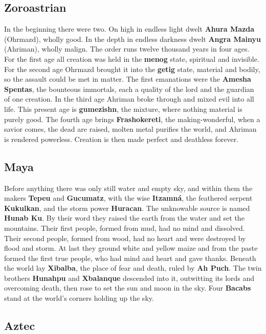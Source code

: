 
\subsection{Zoroastrian}

In the beginning there were two. On high in endless light dwelt \textbf{Ahura Mazda} (Ohrmazd), wholly good. In the depth in endless darkness dwelt \textbf{Angra Mainyu} (Ahriman), wholly malign. The order runs twelve thousand years in four ages. For the first age all creation was held in the \textbf{menog} state, spiritual and invisible. For the second age Ohrmazd brought it into the \textbf{getig} state, material and bodily, so the assault could be met in matter. The first emanations were the \textbf{Amesha Spentas}, the bounteous immortals, each a quality of the lord and the guardian of one creation. In the third age Ahriman broke through and mixed evil into all life. This present age is \textbf{gumezishn}, the mixture, where nothing material is purely good. The fourth age brings \textbf{Frashokereti}, the making-wonderful, when a savior comes, the dead are raised, molten metal purifies the world, and Ahriman is rendered powerless. Creation is then made perfect and deathless forever.

\subsection{Maya}

Before anything there was only still water and empty sky, and within them the makers \textbf{Tepeu} and \textbf{Gucumatz}, with the wise \textbf{Itzamn\'a}, the feathered serpent \textbf{Kukulkan}, and the storm power \textbf{Huracan}. The unknowable source is named \textbf{Hunab Ku}. By their word they raised the earth from the water and set the mountains. Their first people, formed from mud, had no mind and dissolved. Their second people, formed from wood, had no heart and were destroyed by flood and storm. At last they ground white and yellow maize and from the paste formed the first true people, who had mind and heart and gave thanks. Beneath the world lay \textbf{Xibalba}, the place of fear and death, ruled by \textbf{Ah Puch}. The twin brothers \textbf{Hunahpu} and \textbf{Xbalanque} descended into it, outwitting its lords and overcoming death, then rose to set the sun and moon in the sky. Four \textbf{Bacabs} stand at the world's corners holding up the sky.

\subsection{Aztec}

